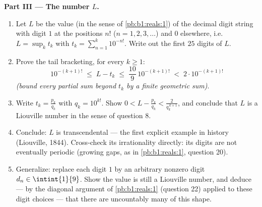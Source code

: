 \begin{problem}
\medskip
\noindent\textbf{Part III --- The number $L$.}
\begin{enumerate}[resume]
  \item Let $L$ be the value (in the sense of
        \cref{pb:b1:reals:1}) of the decimal digit string with
        digit $1$ at the positions $n!$ ($n = 1, 2, 3, \dots$)
        and $0$ elsewhere, i.e.\ $L = \sup_k t_k$ with $t_k =
        \sum_{n=1}^{k} 10^{-n!}$. Write out the first $25$
        digits of $L$.
  \item Prove the tail bracketing, for every $k \geq 1$:
        \[
        10^{-(k+1)!} \;\leq\; L - t_k \;\leq\;
        \frac{10}{9}\,10^{-(k+1)!} \;<\; 2\cdot 10^{-(k+1)!}
        \]
        \emph{(bound every partial sum beyond $t_k$ by a finite
        geometric sum)}.
  \item Write $t_k = \frac{p_k}{q_k}$ with $q_k = 10^{k!}$.
        Show $0 < L - \frac{p_k}{q_k} < \frac{2}{q_k^{\,k+1}}$,
        and conclude that $L$ is a Liouville number in the sense
        of question 8.
  \item Conclude: $L$ is transcendental --- the first explicit
        example in history (Liouville, 1844). Cross-check its
        irrationality directly: its digits are not eventually
        periodic (growing gaps, as in \cref{pb:b1:reals:1},
        question 20).
  \item Generalize: replace each digit $1$ by an arbitrary
        nonzero digit $d_n \in \intint{1}{9}$. Show the value is
        still a Liouville number, and deduce --- by the diagonal
        argument of \cref{pb:b1:reals:1} (question 22) applied
        to these digit choices --- that there are uncountably
        many  of this shape.
\end{enumerate}


\end{problem}
